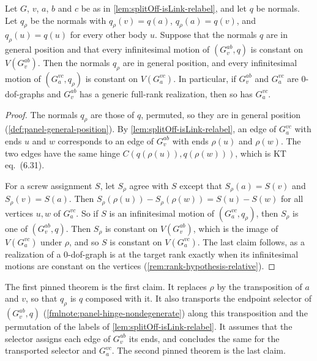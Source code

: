\begin{lemma}[A realization of $G_a^{vc}$; KT eq.\ (6.31)]
  \label{lem:splitOff-ofNormals-relabel}
  \leanok
  Let $G$, $v$, $a$, $b$ and $c$ be as in
  \cref{lem:splitOff-isLink-relabel}, and let $q$ be normals. Let
  $q_\rho$ be the normals with $q_\rho(v) = q(a)$, $q_\rho(a) = q(v)$, and
  $q_\rho(u) = q(u)$ for every other body $u$. Suppose that the normals
  $q$ are in general position and that every infinitesimal motion of
  $(G_v^{ab}, q)$ is constant on $V(G_v^{ab})$. Then the normals $q_\rho$
  are in general position, and every infinitesimal motion of
  $(G_a^{vc}, q_\rho)$ is constant on $V(G_a^{vc})$. In particular, if
  $G_v^{ab}$ and $G_a^{vc}$ are $0$-dof-graphs and $G_v^{ab}$ has a
  generic full-rank realization, then so has $G_a^{vc}$.
\end{lemma}
\begin{proof}
  \leanok
  The normals $q_\rho$ are those of $q$, permuted, so they are in general
  position (\cref{def:panel-general-position}). By
  \cref{lem:splitOff-isLink-relabel}, an edge of $G_a^{vc}$ with ends $u$
  and $w$ corresponds to an edge of $G_v^{ab}$ with ends $\rho(u)$ and
  $\rho(w)$. The two edges have the same hinge
  $C(q(\rho(u)), q(\rho(w)))$, which is KT eq.~(6.31).

  For a screw assignment $S$, let $S_\rho$ agree with $S$ except that
  $S_\rho(a) = S(v)$ and $S_\rho(v) = S(a)$. Then
  $S_\rho(\rho(u)) - S_\rho(\rho(w)) = S(u) - S(w)$ for all vertices
  $u, w$ of $G_a^{vc}$. So if $S$ is an infinitesimal motion of
  $(G_a^{vc}, q_\rho)$, then $S_\rho$ is one of $(G_v^{ab}, q)$. Then
  $S_\rho$ is constant on $V(G_v^{ab})$, which is the image of
  $V(G_a^{vc})$ under $\rho$, and so $S$ is constant on $V(G_a^{vc})$.
  The last claim follows, as a realization of a $0$-dof-graph is at the
  target rank exactly when its infinitesimal motions are constant on the
  vertices (\cref{rem:rank-hypothesis-relative}).
\end{proof}

\begin{fmlnote}
  The first pinned theorem is the first claim. It replaces $\rho$ by the
  transposition of $a$ and $v$, so that $q_\rho$ is $q$ composed with it.
  It also transports the endpoint selector of $(G_v^{ab}, q)$
  (\cref{fmlnote:panel-hinge-nondegenerate}) along this transposition and
  the permutation of the labels of \cref{lem:splitOff-isLink-relabel}. It
  assumes that the selector assigns each edge of $G_v^{ab}$ its ends, and
  concludes the same for the transported selector and $G_a^{vc}$. The
  second pinned theorem is the last claim.
\end{fmlnote}

